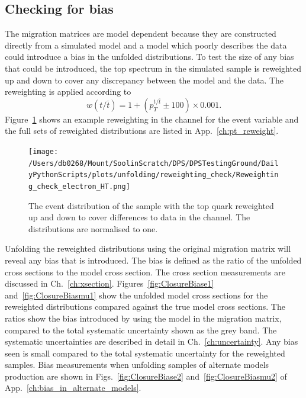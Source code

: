 

\subsection{Checking for bias} %
\label{sub:checking_for_bias}

The migration matrices are model dependent because they are constructed directly from a simulated \ttbar{} model and a model which poorly describes the data could introduce a bias in the unfolded distributions. 
To test the size of any bias that could be introduced, the top \pt{} spectrum in the simulated \powhegpythia{} sample is reweighted up and down to cover any discrepancy between the \powhegpythia{} model and the data.
The reweighting is applied according to
\begin{equation*}
w(t/\overline{t})=1+(p_{T}^{t/\overline{t}} \pm 100) \times 0.001.
\end{equation*}
Figure~\ref{fig:reweightExample} shows an example reweighting in the \eJets{} channel for the \HT{} event variable and the full sets of reweighted distributions are listed in App.~\ref{ch:pt_reweight}.
\begin{figure}[htpb]
	\centering
	\texttt{[image: /Users/db0268/Mount/SoolinScratch/DPS/DPSTestingGround/DailyPythonScripts/plots/unfolding/reweighting\_check/Reweighting\_check\_electron\_HT.png]}
	\caption[The \HT{} event distribution of the \powhegpythia{} sample with the top quark \pt{} reweighted up and down to cover differences to data in the \eJets{} channel. The distributions are normalised to one.]{The \HT{} event distribution of the \powhegpythia{} sample with the top quark \pt{} reweighted up and down to cover differences to data in the \eJets{} channel. The distributions are normalised to one.}
	\label{fig:reweightExample}
\end{figure}

Unfolding the reweighted distributions using the original migration matrix will reveal any bias that is introduced.
The bias is defined as the ratio of the unfolded cross sections to the model cross section.
The cross section measurements are discussed in Ch.~\ref{ch:xsection}.
Figures~\ref{fig:ClosureBiase1} and~\ref{fig:ClosureBiasmu1} show the unfolded model cross sections for the reweighted distributions compared against the true model cross sections.
The ratios show the bias introduced by using the \powhegpythia{} model in the migration matrix, compared to the total systematic uncertainty shown as the grey band.
The systematic uncertainties are described in detail in Ch.~\ref{ch:uncertainty}.
Any bias seen is small compared to the total systematic uncertainty for the reweighted samples.
Bias measurements when unfolding samples of alternate models \ttbar{} production are shown in Figs.~\ref{fig:ClosureBiase2} and~\ref{fig:ClosureBiasmu2} of App.~\ref{ch:bias_in_alternate_models}.

% 

